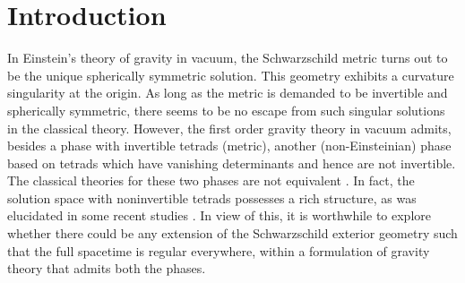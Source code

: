 \documentclass[preprint,aps,superscriptaddress,nofootinbib]{revtex4-1}
\begin{document}
\section{Introduction}
In Einstein's theory of gravity in vacuum, the Schwarzschild metric turns 
out to be the unique spherically symmetric solution. This geometry 
exhibits a curvature singularity at the origin.
As long as the metric is demanded to be invertible and spherically 
symmetric, there seems to be no escape from such singular solutions 
in the classical theory. 
 However, the first order gravity theory in vacuum  admits, besides 
a phase with invertible tetrads (metric), another (non-Einsteinian) 
phase based on  tetrads which have vanishing determinants and hence 
 are not invertible. The classical theories for these two phases are not 
equivalent \cite{tseytlin}. In fact, the solution space with noninvertible 
tetrads possesses a rich structure, as was elucidated in some recent 
studies \cite{kaul,kaul1}. In view of this, it is worthwhile to explore 
whether there could be any extension of the Schwarzschild exterior 
geometry such that the full spacetime is regular everywhere, within 
a formulation of gravity theory that admits both the phases. 
\end{document}
